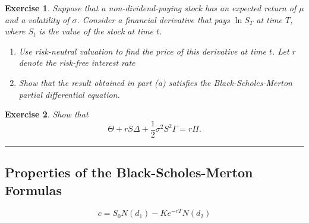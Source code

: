 \documentclass[letterpaper,10pt]{article}
\newtheorem{ex}{Exercise}
\begin{document}
\begin{ex}
Suppose that a non-dividend-paying stock has an expected return of $\mu$ and a volatility of $\sigma$. Consider a financial derivative that pays $\displaystyle\ln S_T$ at time $T$, where $S_t$ is the value of the stock at time $t$.

\begin{enumerate}

\item[(a)] Use risk-neutral valuation to find the price of this derivative at time $t$.  Let $r$ denote the risk-free interest rate

\item[(b)] Show that the result obtained in part (a) satisfies the Black-Scholes-Merton partial differential equation.

\end{enumerate}

\end{ex}


\begin{ex}
Show that $$\Theta+rS\Delta+\frac{1}{2}\sigma^2S^2\Gamma=r\Pi.$$
\end{ex}

\bigskip

\hrule

\bigskip

\subsection{Properties of the Black-Scholes-Merton Formulas}

$$c=S_0N(d_1)-Ke^{-rT}N(d_2)$$
\end{document}
